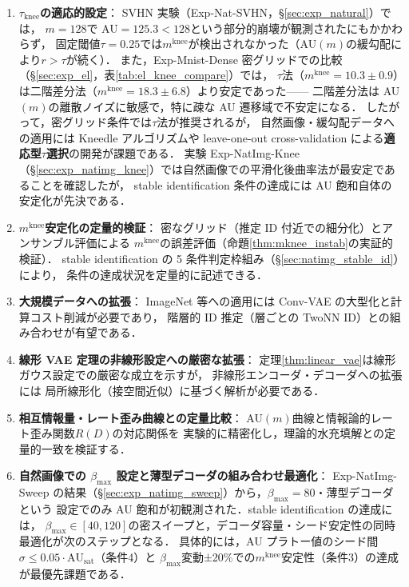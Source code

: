 \documentclass[11pt,a4paper]{jsarticle}
\newcommand{\AUsat}{\mathrm{AU}_{\mathrm{sat}}}
\newcommand{\mknee}{m^{\mathrm{knee}}}
\begin{document}
\begin{enumerate}
  \item \textbf{$\tau_{\mathrm{knee}}$の適応的設定}：
        SVHN 実験（Exp-Nat-SVHN，§\ref{sec:exp_natural}）では，
        $m = 128$で AU$= 125.3 < 128$という部分的崩壊が観測されたにもかかわらず，
        固定閾値$\tau = 0.25$では$\mknee$が検出されなかった（AU$(m)$の緩勾配により$r > \tau$が続く）．
        また，Exp-Mnist-Dense 密グリッドでの比較（§\ref{sec:exp_el}，表\ref{tab:el_knee_compare}）では，
        $\tau$法（$\mknee=10.3\pm0.9$）は二階差分法（$\mknee=18.3\pm6.8$）より安定であった——
        二階差分法は AU$(m)$の離散ノイズに敏感で，特に疎な AU 遷移域で不安定になる．
        したがって，密グリッド条件では$\tau$法が推奨されるが，
        自然画像・緩勾配データへの適用には Kneedle アルゴリズムや
        leave-one-out cross-validation による\textbf{適応型$\tau$選択}の開発が課題である．
        実験 Exp-NatImg-Knee（§\ref{sec:exp_natimg_knee}）では自然画像での平滑化後曲率法が最安定であることを確認したが，
        stable identification 条件の達成には AU 飽和自体の安定化が先決である．
  \item \textbf{$\mknee$安定化の定量的検証}：
        密なグリッド（推定 ID 付近での細分化）とアンサンブル評価による
        $\mknee$の誤差評価（命題\ref{thm:mknee_instab}の実証的検証）．
        stable identification の 5 条件判定枠組み（§\ref{sec:natimg_stable_id}）により，
        条件の達成状況を定量的に記述できる．
  \item \textbf{大規模データへの拡張}：
        ImageNet 等への適用には Conv-VAE の大型化と計算コスト削減が必要であり，
        階層的 ID 推定（層ごとの TwoNN ID）との組み合わせが有望である．
  \item \textbf{線形 VAE 定理の非線形設定への厳密な拡張}：
        定理\ref{thm:linear_vae}は線形ガウス設定での厳密な成立を示すが，
        非線形エンコーダ・デコーダへの拡張には
        局所線形化（接空間近似）に基づく解析が必要である．
  \item \textbf{相互情報量・レート歪み曲線との定量比較}：
        AU$(m)$曲線と情報論的レート歪み関数$R(D)$の対応関係を
        実験的に精密化し，理論的水充填解との定量的一致を検証する．
  \item \textbf{自然画像での $\beta_{\max}$ 設定と薄型デコーダの組み合わせ最適化}：
        Exp-NatImg-Sweep の結果（§\ref{sec:exp_natimg_sweep}）から，$\beta_{\max}=80$・薄型デコーダという
        設定でのみ AU 飽和が初観測された．stable identification の達成には，
        $\beta_{\max} \in [40,120]$の密スイープと，デコーダ容量・シード安定性の同時最適化が次のステップとなる．
        具体的には，AU プラトー値のシード間$\sigma \leq 0.05 \cdot \AUsat$（条件4）と
        $\beta_{\max}$変動±20\%での$\mknee$安定性（条件3）の達成が最優先課題である．
\end{enumerate}
\end{document}
